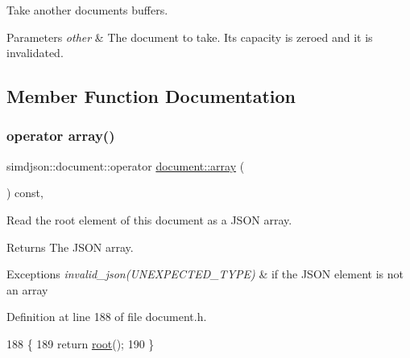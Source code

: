 Take another document\textquotesingle{}s buffers. 


\begin{DoxyParams}{Parameters}
{\em other} & The document to take. Its capacity is zeroed and it is invalidated. \\
\hline
\end{DoxyParams}


\subsection{Member Function Documentation}
\mbox{\label{classsimdjson_1_1document_aaa5e5da59a1c43f6936f4f5eab35a387}} 
\subsubsection{\texorpdfstring{operator array()}{operator array()}}
{\footnotesize\ttfamily simdjson\+::document\+::operator \hyperlink{classsimdjson_1_1document_1_1array}{document\+::array} (\begin{DoxyParamCaption}{ }\end{DoxyParamCaption}) const\hspace{0.3cm}{\ttfamily [inline]}, {\ttfamily [noexcept]}}



Read the root element of this document as a J\+S\+ON array. 

\begin{DoxyReturn}{Returns}
The J\+S\+ON array. 
\end{DoxyReturn}

\begin{DoxyExceptions}{Exceptions}
{\em invalid\+\_\+json(\+U\+N\+E\+X\+P\+E\+C\+T\+E\+D\+\_\+\+T\+Y\+P\+E)} & if the J\+S\+ON element is not an array \\
\hline
\end{DoxyExceptions}


Definition at line 188 of file document.\+h.


\begin{DoxyCode}
188                                                               \{
189   \textcolor{keywordflow}{return} \hyperlink{classsimdjson_1_1document_ad240c2d93c83c378e8220e667d0bdee2}{root}();
190 \}
\end{DoxyCode}
\mbox{\label{classsimdjson_1_1document_ada83cc5e02ba0f46d5d88e347bd119c1}} 
